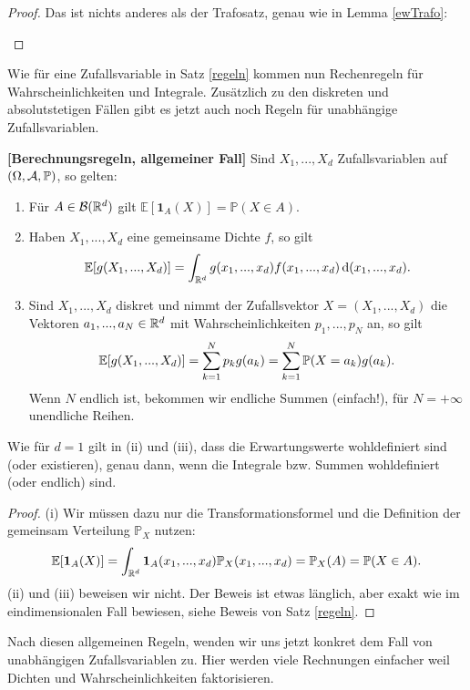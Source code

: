 \begin{proof}
	Das ist nichts anderes als der Trafosatz, genau wie in Lemma \ref{ewTrafo}:
	\begin{center}		
	\end{center}
\end{proof}
Wie f\"ur eine Zufallsvariable in Satz \ref{regeln} kommen nun Rechenregeln f\"ur Wahrscheinlichkeiten und Integrale. Zus\"atzlich zu den diskreten und absolutstetigen F\"allen gibt es jetzt auch noch Regeln f\"ur unabh\"angige Zufallsvariablen.
\begin{satz}\label{ber1}
 \textbf{[Berechnungsregeln, allgemeiner Fall]}
Sind $X_1,...,X_d$ Zufallsvariablen auf $(\Omega, \mathcal{A}, \mathbb{P})$, so gelten:
	\begin{enumerate}[label=(\roman*)]
		\item F\"ur $A\in \mathcal B(\mathbb{R}^d)$ gilt $\mathbb E[\mathbf 1_{A}(X)]=\mathbb P(X \in A)$.
		\item Haben $X_1,...,X_d$ eine gemeinsame Dichte $f$, so gilt 
		\[ \mathbb{E}[g(X_1,...,X_d)] =\int_{\mathbb{R}^d}g(x_1,...,x_d) f(x_1,...,x_d) \, \mathrm{d} (x_1,...,x_d).  \]
		\item Sind $X_1,...,X_d$ diskret und nimmt der Zufallsvektor $X=(X_1,...,X_d)$ die Vektoren $a_1, ..., a_N\in\mathbb{R}^d$ mit Wahrscheinlichkeiten $p_1, ..., p_N$ an, so gilt \[ \mathbb{E}[g(X_1,...,X_d)]= \sum\limits_{k=1}^{N} p_k g(a_k) = \sum\limits_{k=1}^{N} \mathbb{P}(X=a_k) g(a_k) . \]
		Wenn $N$ endlich ist, bekommen wir  endliche Summen (einfach!), f\"ur $N=+\infty$ unendliche Reihen.	
	\end{enumerate}
	Wie f\"ur $d=1$ gilt in (ii) und (iii), dass die Erwartungswerte wohldefiniert sind (oder existieren), genau dann, wenn die Integrale bzw. Summen wohldefiniert (oder endlich) sind.
\end{satz}
\begin{proof}
(i) Wir m\"ussen dazu nur die Transformationsformel und die Definition der gemeinsam Verteilung $\mathbb P_X$ nutzen:
	\begin{align*}
		\mathbb E[\mathbf 1_{A}(X)]= \int_{\mathbb{R}^d}\mathbf 1_{A}(x_1,...,x_d)\mathbb P_X(x_1,...,x_d)= \mathbb P_X(A)=\mathbb P(X\in A).
	\end{align*}	
(ii) und (iii) beweisen wir nicht. Der Beweis ist etwas l\"anglich, aber exakt wie im eindimensionalen Fall bewiesen, siehe Beweis von Satz \ref{regeln}.
\end{proof}
Nach diesen allgemeinen Regeln, wenden wir uns jetzt konkret dem Fall von unabh\"angigen Zufallsvariablen zu. Hier werden viele Rechnungen einfacher weil Dichten und Wahrscheinlichkeiten faktorisieren.


